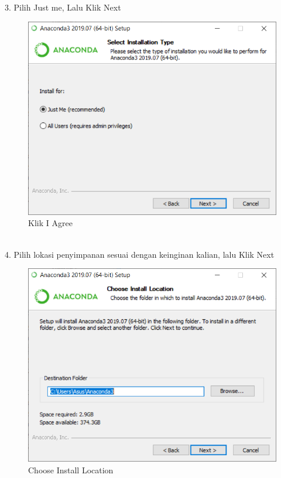 \documentclass[12pt, times new roman, a4paper]{article}
\begin{document}
\\
\\
\\
\\
\\
\\
\\
3. Pilih Just me, Lalu Klik Next\\
\begin{figure}[h]
	\centering
		\includegraphics[scale=0.5]{Gambar/A3}
	\caption{Klik I Agree}
\end{figure}
\\
4. Pilih lokasi penyimpanan sesuai dengan keinginan kalian, lalu Klik Next\\
\begin{figure}[h]
	\centering
		\includegraphics[scale=0.5]{Gambar/A4}
	\caption{Choose Install Location}
\end{figure}
\end{document}
